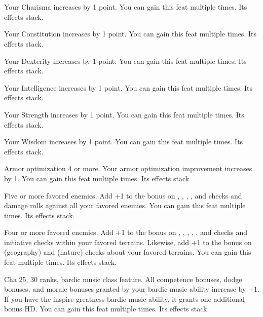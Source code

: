 {\\
\\
}





{}{}
{Your Charisma increases by 1 point.}
{}{You can gain this feat multiple times. Its effects stack.}

{}{}
{Your Constitution increases by 1 point.}
{}{You can gain this feat multiple times. Its effects stack.}

{}{}
{Your Dexterity increases by 1 point.}
{}{You can gain this feat multiple times. Its effects stack.}

{}{}
{Your Intelligence increases by 1 point.}
{}{You can gain this feat multiple times. Its effects stack.}

{}{}
{Your Strength increases by 1 point.}
{}{You can gain this feat multiple times. Its effects stack.}

{}{}
{Your Wisdom increases by 1 point.}
{}{You can gain this feat multiple times. Its effects stack.}

{}
{Armor optimization 4 or more.}
{Your armor optimization improvement increases by 1.}
{}{You can gain this feat multiple times. Its effects stack.}

{}
{Five or more favored enemies.}
{Add +1 to the bonus on , , , , and  checks and damage rolls against all your favored enemies.}
{}{You can gain this feat multiple times. Its effects stack.}

{}
{Four or more favored enemies.}
{Add +1 to the bonus on , , , , , and  checks and initiative checks within your favored terrains. Likewise, add +1 to the bonus on  (geography) and  (nature) checks about your favored terrains.}
{}{You can gain this feat multiple times. Its effects stack.}

{}
{Cha 25,  30 ranks, bardic music class feature.}
{All competence bonuses, dodge bonuses, and morale bonuses granted by your bardic music ability increase by +1. If you have the inspire greatness bardic music ability, it grants one additional bonus HD.}
{}{You can gain this feat multiple times. Its effects stack.}


